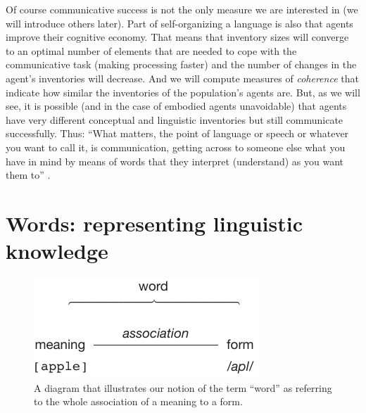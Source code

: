 Of course communicative success is not the only measure we are
interested in (we will introduce others later). Part of
self-organizing a language is also that agents improve their cognitive
economy. That means that inventory sizes will converge to an optimal
number of elements that are needed to cope with the communicative task
(making processing faster) and the number of changes in the agent's
inventories will decrease. And we will compute measures of
\emph{coherence} that indicate how similar the inventories of the
population's agents are. But, as we will see, it is possible (and in
the case of embodied agents unavoidable) that agents have very
different conceptual and linguistic inventories but still communicate
successfully. Thus: ``What matters, the point of language or speech or
whatever you want to call it, is communication, getting across to
someone else what you have in mind by means of words that they
interpret (understand) as you want them to''
\citep[p. 120]{davidson05truth}.



\section{Words: representing linguistic knowledge}
\label{s:representing-linguistic-knowlede}

\begin{figure}
  \parbox{0.6\textwidth}{\centerline{\includegraphics{figures/saussurean-sign}}}
  \caption{A diagram that illustrates our notion of the term ``word''
    as referring to the whole association of a meaning to a form.}
  \label{f:saussurean-sign}
\end{figure}

